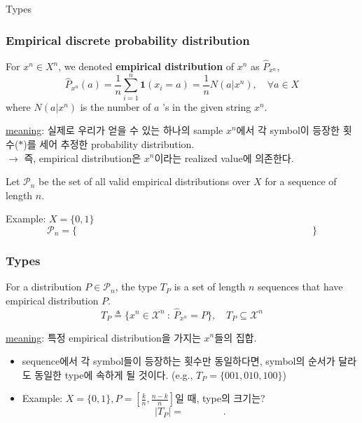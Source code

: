 \documentclass[9pt]{beamer}
\begin{document}
\begin{section}{Types}
        \begin{frame}
            \frametitle{Empirical discrete probability distribution}
            \begin{definition}
                For $x^n \in X^n$, we denoted \textbf{empirical distribution} of $x^n$ as $\hat{P}_{x^n}$,
                $$\hat{P}_{x^n}(a) =\frac{1}{n} \sum_{i=1}^n \mathbf{1}\left(x_i=a\right) =\frac{1}{n} N\left(a | x^n\right) , \quad \forall a \in X  $$ where $N\left(a | x^n\right)$ is the number of $a$ 's in the given string $x^n$.
            \end{definition}
            \vspace{0.2cm}
            \checkmark \underline{meaning}: 실제로 우리가 얻을 수 있는 하나의 sample $x^n$에서 각 symbol이 등장한 \alert{횟수}($\ast$)를 세어 추정한 probability distribution.
            \\$\rightarrow$ 즉, empirical distribution은 $x^n$이라는 realized value에 의존한다. 
            \vspace{0.2cm}
            \begin{definition}
                Let $\mathcal{P}_n$ be the set of all valid empirical distributions over $X$ for a sequence of length $n$.
            \end{definition}
            \vspace{0.2cm}
            Example: $X = \{0, 1\}$
            $$ \mathcal P_n = \Big\{ \qquad \qquad \qquad \qquad \qquad \qquad \qquad \qquad \qquad\qquad \qquad \qquad \Big\}$$
        \end{frame}

        \begin{frame}
            \frametitle{Types}
            \begin{definition}[type]
                For a distribution $P \in \mathcal P_n$, the type $T_P$ is a set of length $n$ sequences that have empirical distribution $P$. 
                $$ T_P \triangleq \{ x^n \in \mathcal X^n \ : \  \hat P_{x^n} = P\},\quad T_P \subseteq \mathcal X^n$$
            \end{definition}
            \vspace{0.2cm}
            \checkmark \underline{meaning}: 특정 empirical distribution을 가지는 $x^n$들의 집합.
            \vspace{0.2cm}
            \begin{itemize}
                \item sequence에서 각 symbol들이 등장하는 횟수만 동일하다면, symbol의 순서가 달라도 동일한 type에 속하게 될 것이다. (e.g., $T_P = \{001, 010, 100\}$)
                \item Example: $X = \{0, 1\}, P = [\frac{k}{n}, \frac{n-k}{n}]$일 때, type의 크기는?
                \vspace{0.2cm}
                $$ |T_P| = \qquad \qquad.$$
            \end{itemize}


\end{frame}
\end{section}
\end{document}
